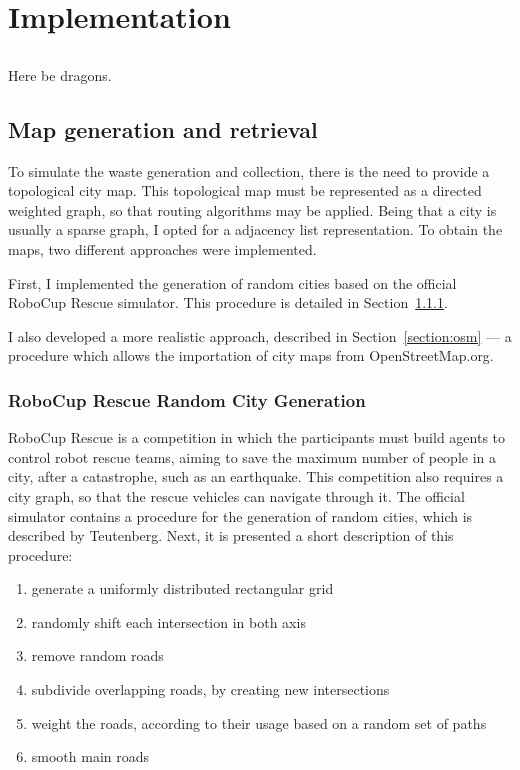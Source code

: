 \chapter{Implementation}
\label{chap:implementation}

\section*{}
Here be dragons.

\section{Map generation and retrieval}
\label{section:map-generation}

To simulate the waste generation and collection, there is the need to provide a
topological city map. This topological map must be represented as a directed
weighted graph, so that routing algorithms may be applied. Being that a city is
usually a sparse graph, I opted for a adjacency list representation. To obtain
the maps, two different approaches were implemented.

First, I implemented the generation of random cities based on the official
RoboCup Rescue simulator. This procedure is detailed in
Section~\ref{section:roborescue}.

I also developed a more realistic approach, described in
Section~\ref{section:osm}  --- a procedure which allows the importation of city
maps from OpenStreetMap.org.




\subsection{RoboCup Rescue Random City Generation}
\label{section:roborescue}

RoboCup Rescue is a competition in which the participants must build agents to
control robot rescue teams, aiming to save the maximum number of people in a
city, after a catastrophe, such as an earthquake. This competition also
requires a city graph, so that the rescue vehicles can navigate through it.
The official simulator contains a procedure for the generation of random
cities, which is described by Teutenberg\citep{Teutenberg03}. Next, it is
presented a short description of this procedure:

\begin{enumerate}
	\item generate a uniformly distributed rectangular grid
	\item randomly shift each intersection in both axis
	\item remove random roads
	\item subdivide overlapping roads, by creating new intersections
	\item weight the roads, according to their usage based on a random set of paths
	\item smooth main roads
\end{enumerate}

